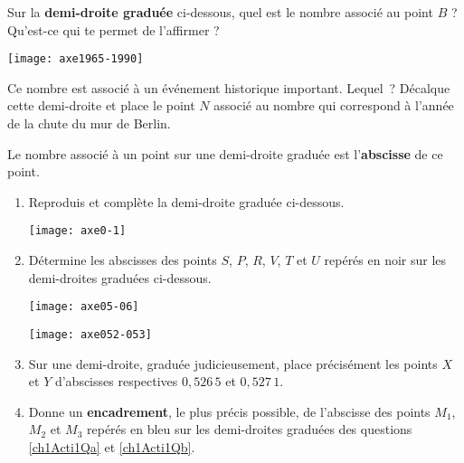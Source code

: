 \begin{activite}

\begin{partie}
Sur la \textbf{demi-droite graduée} ci-dessous, quel est le nombre associé au point $B$ ? Qu'est-ce qui te permet de l'affirmer ?

\texttt{[image: axe1965-1990]}

Ce nombre est associé à un événement historique important. Lequel ?
Décalque cette demi-droite et place le point $N$ associé au nombre qui correspond à l'année de la chute du mur de Berlin.

Le nombre associé à un point sur une demi-droite graduée est l'\textbf{abscisse} de ce point.

\end{partie}

\begin{partie}
\begin{enumerate}
 \item Reproduis et complète la demi-droite graduée ci-dessous. \label{ch1Acti1Qa}
 
 \texttt{[image: axe0-1]}
 
 \item Détermine les abscisses des points $S$, $P$, $R$, $V$, $T$ et $U$ repérés en noir sur les demi-droites graduées ci-dessous.\label{ch1Acti1Qb}
 
\texttt{[image: axe05-06]}

\texttt{[image: axe052-053]}
 
 \item Sur une demi-droite, graduée judicieusement, place précisément les points $X$ et $Y$ d'abscisses respectives $0,526\,5$ et $0,527\,1$.
 \item Donne un \textbf{encadrement}, le plus précis possible, de l'abscisse des points $M_1$, $M_2$ et $M_3$ repérés en bleu sur les demi-droites graduées des questions \ref{ch1Acti1Qa} et \ref{ch1Acti1Qb}.
 \end{enumerate}
\end{partie}

\end{activite}




